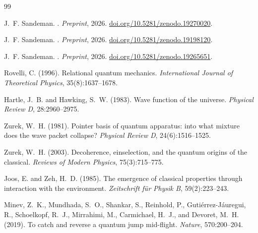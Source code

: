 \documentclass[11pt,a4paper]{article}
\theoremstyle{plain}
\theoremstyle{definition}
\theoremstyle{remark}
\begin{document}

\begin{thebibliography}{99}

J.~F. Sandeman.
.
\newblock \textit{Preprint}, 2026.
\newblock \href{https://doi.org/10.5281/zenodo.19270020}{doi.org/10.5281/zenodo.19270020}.


J.~F. Sandeman.
.
\newblock \textit{Preprint}, 2026.
\newblock \href{https://doi.org/10.5281/zenodo.19198120}{doi.org/10.5281/zenodo.19198120}.


J.~F. Sandeman.
.
\newblock \textit{Preprint}, 2026.
\newblock \href{https://doi.org/10.5281/zenodo.19265651}{doi.org/10.5281/zenodo.19265651}.


Rovelli, C. (1996).
\newblock Relational quantum mechanics.
\newblock \emph{International Journal of Theoretical Physics}, 35(8):1637--1678.

Hartle, J.~B. and Hawking, S.~W. (1983).
\newblock Wave function of the universe.
\newblock \emph{Physical Review D}, 28:2960--2975.

Zurek, W.~H. (1981).
\newblock Pointer basis of quantum apparatus: into what mixture does the wave packet collapse?
\newblock \emph{Physical Review D}, 24(6):1516--1525.

Zurek, W.~H. (2003).
\newblock Decoherence, einselection, and the quantum origins of the classical.
\newblock \emph{Reviews of Modern Physics}, 75(3):715--775.

Joos, E. and Zeh, H.~D. (1985).
\newblock The emergence of classical properties through interaction with the environment.
\newblock \emph{Zeitschrift f\"{u}r Physik B}, 59(2):223--243.

Minev, Z.~K., Mundhada, S.~O., Shankar, S., Reinhold, P.,
  Guti\'{e}rrez-J\'{a}uregui, R., Schoelkopf, R.~J., Mirrahimi, M.,
  Carmichael, H.~J., and Devoret, M.~H. (2019).
\newblock To catch and reverse a quantum jump mid-flight.
\newblock \emph{Nature}, 570:200--204.


\end{thebibliography}
\end{document}
